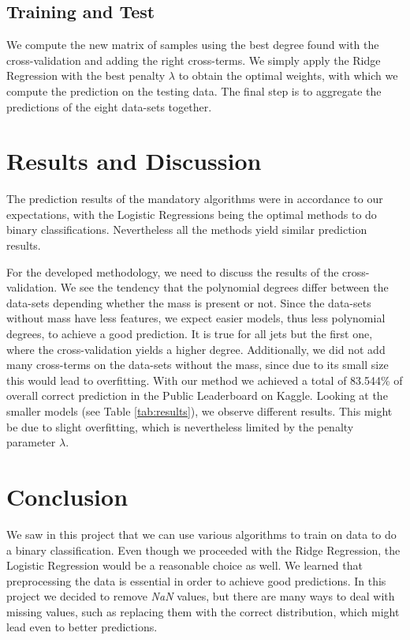\documentclass[10pt,conference,compsocconf]{IEEEtran}
\begin{document}
\subsection{Training and Test}
We compute the new matrix of samples using the best degree found with the cross-validation and adding the right cross-terms. We simply apply the Ridge Regression with the best penalty $\lambda$ to obtain the optimal weights, with which we compute the prediction on the testing data. The final step is to aggregate the predictions of the eight data-sets together.

\section{Results and Discussion}

The prediction results of the mandatory algorithms were in accordance to our expectations, with the Logistic Regressions being the optimal methods to do binary classifications. Nevertheless all the methods yield similar prediction results.

For the developed methodology, we need to discuss the results of the cross-validation. We see the tendency that the polynomial degrees differ between the data-sets depending whether the mass is present or not. Since the data-sets without mass have less features, we expect easier models, thus less polynomial degrees, to achieve a good prediction. It is true for all jets but the first one, where the cross-validation yields a higher degree. Additionally, we did not add many cross-terms on the data-sets without the mass, since due to its small size this would lead to overfitting.
With our method we achieved a total of 83.544\% of overall correct prediction in the Public Leaderboard on Kaggle. Looking at the smaller models (see Table \ref{tab:results}), we observe different results. This might be due to slight overfitting, which is nevertheless limited by the penalty parameter $\lambda$.

\section{Conclusion}

We saw in this project that we can use various algorithms to train on data to do a binary classification. Even though we proceeded with the Ridge Regression, the Logistic Regression would be a reasonable choice as well. We learned that preprocessing the data is essential in order to achieve good predictions. In this project we decided to remove \emph{NaN} values, but there are many ways to deal with missing values, such as replacing them with the correct distribution, which might lead even to better predictions. 


%
%
\end{document}

